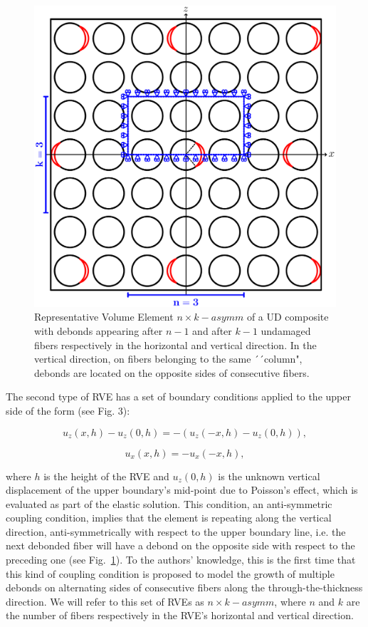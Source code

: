 \begin{figure}[!htb]
\centering
  \includegraphics[height=0.225\textheight]{paperD/asymm.pdf}
\caption{Representative Volume Element $n \times k-asymm$ of a UD composite with debonds appearing after $n-1$ and after $k-1$ undamaged fibers respectively in the horizontal and vertical direction. In the vertical direction, on fibers belonging to the same ´´column", debonds are located on the opposite sides of consecutive fibers.}\label{paperD:fig:asymm-rve}
\end{figure}

The second type of RVE has a set of boundary conditions applied to the upper side of the form (see Fig. 3):

\begin{equation}
u_{z}\left(x,h\right)-u_{z}\left(0,h\right)=-\left(u_{z}\left(-x,h\right)-u_{z}\left(0,h\right)\right),
\end{equation}

\begin{equation}
u_{x}\left(x,h\right)=-u_{x}\left(-x,h\right),
\end{equation}

where $h$ is the height of the RVE and $u_{z}\left(0,h\right)$ is the unknown vertical displacement of the upper boundary’s mid-point due to Poisson’s effect, which is evaluated as part of the elastic solution. This condition, an anti-symmetric coupling condition, implies that the element is repeating along the vertical direction, anti-symmetrically with respect to the upper boundary line, i.e. the next debonded fiber will have a debond on the opposite side with respect to the preceding one (see Fig.~\ref{paperD:fig:asymm-rve}). To the authors’ knowledge, this is the first time that this kind of coupling condition is proposed to model the growth of multiple debonds on alternating sides of consecutive fibers along the through-the-thickness direction. We will refer to this set of RVEs as $n \times k-asymm$, where $n$ and $k$ are the number of fibers respectively in the RVE’s horizontal and vertical direction.

